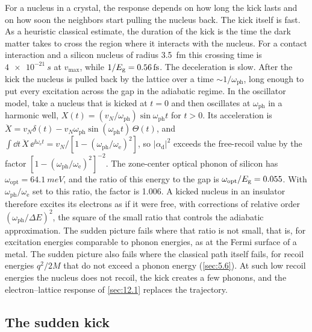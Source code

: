 For a nucleus in a crystal, the response depends on how long the kick lasts and on how soon the neighbors start pulling the nucleus back. The kick itself is fast. As a heuristic classical estimate, the duration of the kick is the time the dark matter takes to cross the region where it interacts with the nucleus. For a contact interaction and a silicon nucleus of radius \SI{3.5}{fm} this crossing time is $\SI{4e-21}{s}$ at $v_{\mathrm{max}}$, while $1/E_{\mathrm{g}} = \SI{0.56}{fs}$. The deceleration is slow. After the kick the nucleus is pulled back by the lattice over a time $\sim1/\omega_{\mathrm{ph}}$, long enough to put every excitation across the gap in the adiabatic regime. In the oscillator model, take a nucleus that is kicked at $t = 0$ and then oscillates at $\omega_{\mathrm{ph}}$ in a harmonic well, $X(t) = (v_N/\omega_{\mathrm{ph}})\sin\omega_{\mathrm{ph}}t$ for $t > 0$. Its acceleration is $\ddot X = v_N\delta(t) - v_N\omega_{\mathrm{ph}}\sin(\omega_{\mathrm{ph}}t)\,\Theta(t)$, and $\int\dd t\,\ddot X\,\ee^{\ii\omega_{\mathrm{e}}t} = v_N/[1 - (\omega_{\mathrm{ph}}/\omega_{\mathrm{e}})^2]$, so $|\alpha_{\mathrm{d}}|^2$ exceeds the free-recoil value by the factor $[1 - (\omega_{\mathrm{ph}}/\omega_{\mathrm{e}})^2]^{-2}$. The zone-center optical phonon of silicon has $\omega_{\mathrm{opt}} = \SI{64.1}{meV}$, and the ratio of this energy to the gap is $\omega_{\mathrm{opt}}/E_{\mathrm{g}} = 0.055$. With $\omega_{\mathrm{ph}}/\omega_{\mathrm{e}}$ set to this ratio, the factor is 1.006. A kicked nucleus in an insulator therefore excites its electrons as if it were free, with corrections of relative order $(\omega_{\mathrm{ph}}/\Delta E)^2$, the square of the small ratio that controls the adiabatic approximation. The sudden picture fails where that ratio is not small, that is, for excitation energies comparable to phonon energies, as at the Fermi surface of a metal. The sudden picture also fails where the classical path itself fails, for recoil energies $q^2/2M$ that do not exceed a phonon energy (\cref{sec:5.6}). At such low recoil energies the nucleus does not recoil, the kick creates a few phonons, and the electron--lattice response of \cref{sec:12.1} replaces the trajectory.

\subsection{The sudden kick}

